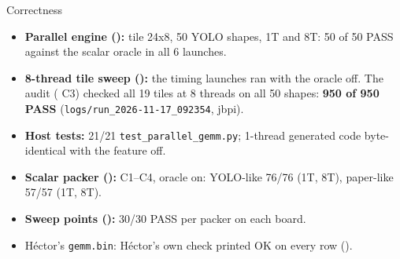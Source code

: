 \begin{frame}{Correctness}
\begin{itemize}\setlength\itemsep{6pt}
\item \textbf{Parallel engine ():} tile 24x8, 50 YOLO shapes, 1T and 8T: 50 of 50 PASS against the scalar oracle in all 6 launches.
\item \textbf{8-thread tile sweep ():} the timing launches ran with the oracle off. The audit ( C3) checked all 19 tiles at 8 threads on all 50 shapes: \textbf{950 of 950 PASS} (\texttt{logs/run\_2026-11-17\_092354}, jbpi).
\item \textbf{Host tests:} 21/21 \texttt{test\_parallel\_gemm.py}; 1-thread generated code byte-identical with the feature off.
\item \textbf{Scalar packer ():} C1--C4, oracle on: YOLO-like 76/76 (1T, 8T), paper-like 57/57 (1T, 8T).
\item \textbf{Sweep points ():} 30/30 PASS per packer on each board.
\item H\'ector's \texttt{gemm.bin}: H\'ector's own check printed OK on every row ().
\end{itemize}
\end{frame}
